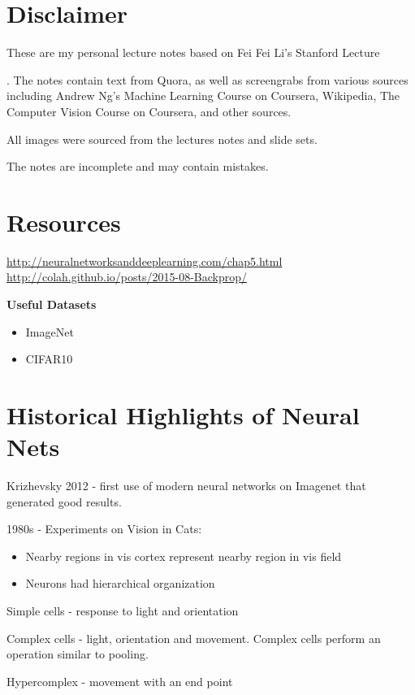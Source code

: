 
\section{Disclaimer}

These are my personal lecture notes based on Fei Fei Li's Stanford Lecture 

. The notes contain text from Quora, as well as screengrabs from various sources including Andrew Ng's Machine Learning Course on Coursera, Wikipedia, The Computer Vision Course on Coursera, and other sources. 

All images were sourced from the lectures notes and slide sets. 

The notes are incomplete and may contain mistakes.

\section{Resources}

\url{http://neuralnetworksanddeeplearning.com/chap5.html}
\url{http://colah.github.io/posts/2015-08-Backprop/}

\textbf{Useful Datasets}
\begin{itemize}
\item ImageNet
\item CIFAR10
\end{itemize}

\section{Historical Highlights of Neural Nets}

Krizhevsky 2012 - first use of modern neural networks on Imagenet that generated good results.

1980s - Experiments on Vision in Cats: 
\begin{itemize}
\item Nearby regions in vis cortex represent nearby region in vis field
\item Neurons had hierarchical organization
\end{itemize}

Simple cells - response to light and orientation 

Complex cells - light, orientation and movement. Complex cells perform an operation similar to pooling.

Hypercomplex - movement with an end point

